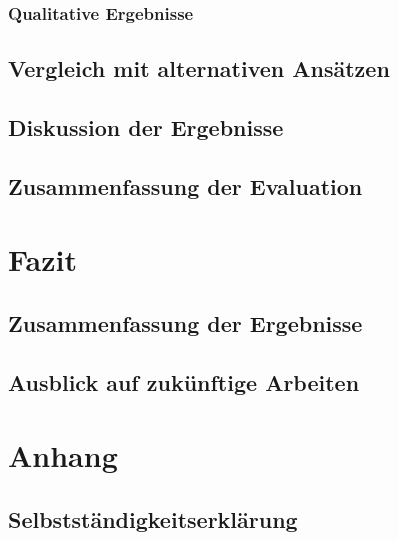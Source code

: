 \documentclass[a4paper,10pt,twoside]{report}
\begin{document}
\subsection{Qualitative Ergebnisse}

\section{Vergleich mit alternativen Ansätzen}

\section{Diskussion der Ergebnisse}

\section{Zusammenfassung der Evaluation}

\chapter{Fazit}
\section{Zusammenfassung der Ergebnisse}
\section{Ausblick auf zukünftige Arbeiten}

\printbibliography[title={Literaturverzeichnis}]

\appendix
\chapter{Anhang}
\section*{Selbstständigkeitserklärung}
\end{document}
